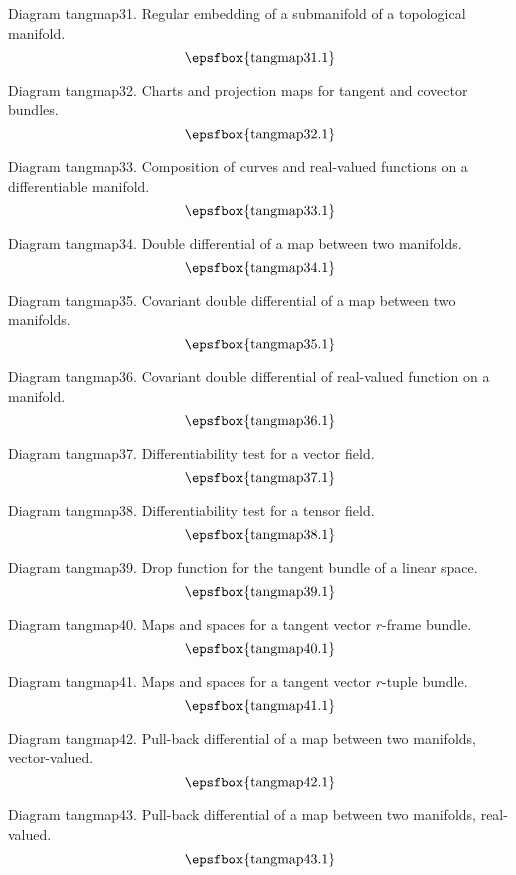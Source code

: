 Diagram tangmap31. Regular embedding of a submanifold of a topological manifold.
$$
\centerline{\epsfbox{tangmap31.1}}
$$

\filleject

Diagram tangmap32. Charts and projection maps for tangent and covector bundles.
$$
\centerline{\epsfbox{tangmap32.1}}
$$

Diagram tangmap33. Composition of curves and real-valued functions on a
differentiable manifold.
$$
\centerline{\epsfbox{tangmap33.1}}
$$

Diagram tangmap34. Double differential of a map between two manifolds.
$$
\centerline{\epsfbox{tangmap34.1}}
$$

\filleject

Diagram tangmap35. Covariant double differential of a map between two manifolds.
$$
\centerline{\epsfbox{tangmap35.1}}
$$

Diagram tangmap36. Covariant double differential of real-valued function on a
manifold.
$$
\centerline{\epsfbox{tangmap36.1}}
$$

Diagram tangmap37. Differentiability test for a vector field.
$$
\centerline{\epsfbox{tangmap37.1}}
$$

Diagram tangmap38. Differentiability test for a tensor field.
$$
\centerline{\epsfbox{tangmap38.1}}
$$

\filleject

Diagram tangmap39. Drop function for the tangent bundle of a linear space.
$$
\centerline{\epsfbox{tangmap39.1}}
$$

Diagram tangmap40. Maps and spaces for a tangent vector $r$-frame bundle.
$$
\centerline{\epsfbox{tangmap40.1}}
$$

Diagram tangmap41. Maps and spaces for a tangent vector $r$-tuple bundle.
$$
\centerline{\epsfbox{tangmap41.1}}
$$

Diagram tangmap42. Pull-back differential of a map between two manifolds,
vector-valued.
$$
\centerline{\epsfbox{tangmap42.1}}
$$

\filleject

Diagram tangmap43. Pull-back differential of a map between two manifolds,
real-valued.
$$
\centerline{\epsfbox{tangmap43.1}}
$$

